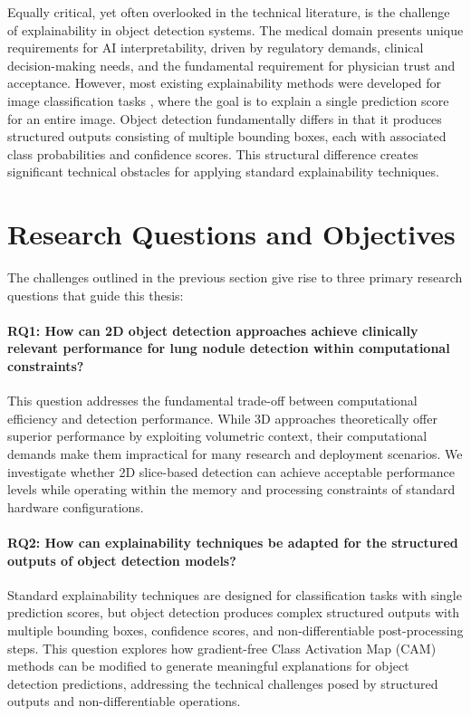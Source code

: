 Equally critical, yet often overlooked in the technical literature, is the challenge of explainability in object detection systems. The medical domain presents unique requirements for AI interpretability, driven by regulatory demands, clinical decision-making needs, and the fundamental requirement for physician trust and acceptance. However, most existing explainability methods were developed for image classification tasks \cite{selvaraju2019gradcam,chattopadhay_2018gradcam++,draelos2021hirescam,jiang2021layercam}, where the goal is to explain a single prediction score for an entire image. Object detection fundamentally differs in that it produces structured outputs consisting of multiple bounding boxes, each with associated class probabilities and confidence scores.
This structural difference creates significant technical obstacles for applying standard explainability techniques.

\section{Research Questions and Objectives}
The challenges outlined in the previous section give rise to three primary research questions that guide this thesis:

\paragraph{RQ1: How can 2D object detection approaches achieve clinically relevant performance for lung nodule detection within computational constraints?}
This question addresses the fundamental trade-off between computational efficiency and detection performance. While 3D approaches theoretically offer superior performance by exploiting volumetric context, their computational demands make them impractical for many research and deployment scenarios. We investigate whether 2D slice-based detection can achieve acceptable performance levels while operating within the memory and processing constraints of standard hardware configurations.

\paragraph{RQ2: How can explainability techniques be adapted for the structured outputs of object detection models?}
Standard explainability techniques are designed for classification tasks with single prediction scores, but object detection produces complex structured outputs with multiple bounding boxes, confidence scores, and non-differentiable post-processing steps. This question explores how gradient-free Class Activation Map (CAM) methods can be modified to generate meaningful explanations for object detection predictions, addressing the technical challenges posed by structured outputs and non-differentiable operations.\bigskip

